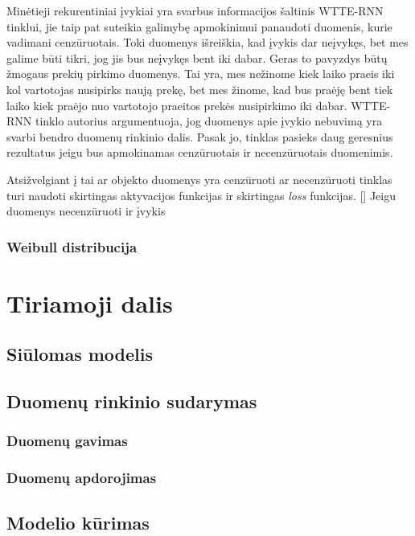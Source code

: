 \documentclass{VUMIFPSkursinis}
\begin{document}
Minėtieji rekurentiniai įvykiai yra svarbus informacijos šaltinis WTTE-RNN tinklui, jie taip pat suteikia galimybę apmokinimui panaudoti duomenis, kurie vadimani cenzūruotais. Toki duomenys išreiškia, kad įvykis dar neįvykęs, bet mes galime būti tikri, jog jis bus neįvykęs bent iki dabar. Geras to pavyzdys būtų žmogaus prekių pirkimo duomenys. Tai yra, mes nežinome kiek laiko praeis iki kol vartotojas nusipirks naują prekę, bet mes žinome, kad bus praėję bent tiek laiko kiek praėjo nuo vartotojo praeitos prekės nusipirkimo iki dabar. WTTE-RNN tinklo autorius argumentuoja, jog duomenys apie įvykio nebuvimą yra svarbi bendro duomenų rinkinio dalis. Pasak jo, tinklas pasieks daug geresnius rezultatus jeigu bus apmokinamas cenzūruotais ir necenzūruotais duomenimis.

Atsižvelgiant į tai ar objekto duomenys yra cenzūruoti ar necenzūruoti tinklas turi naudoti skirtingas aktyvacijos funkcijas ir skirtingas \textit{loss} funkcijas. [] Jeigu duomenys necenzūruoti ir įvykis 

\subsubsection{Weibull distribucija}



\section{Tiriamoji dalis}

\subsection{Siūlomas modelis}

\subsection{Duomenų rinkinio sudarymas}

\subsubsection{Duomenų gavimas}

\subsubsection{Duomenų apdorojimas}

\subsection{Modelio kūrimas}
\end{document}
